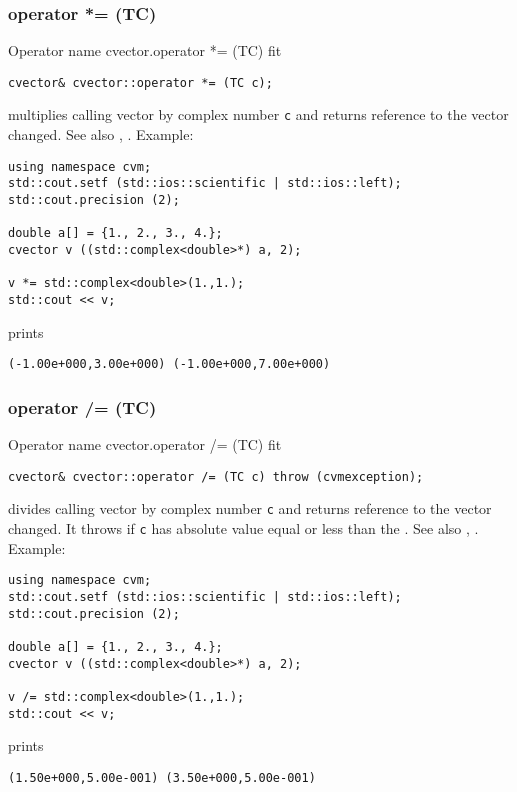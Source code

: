 \subsubsection{operator *= (TC)}
Operator%
\pdfdest name {cvector.operator *= (TC)} fit
\begin{verbatim}
cvector& cvector::operator *= (TC c);
\end{verbatim}
multiplies  calling vector by complex number \verb"c"
and returns  reference to
the vector changed.
See also ,
.
Example:
\begin{Verbatim}
using namespace cvm;
std::cout.setf (std::ios::scientific | std::ios::left);
std::cout.precision (2);

double a[] = {1., 2., 3., 4.};
cvector v ((std::complex<double>*) a, 2);

v *= std::complex<double>(1.,1.);
std::cout << v;
\end{Verbatim}
prints
\begin{Verbatim}
(-1.00e+000,3.00e+000) (-1.00e+000,7.00e+000)
\end{Verbatim}
\newpage



\subsubsection{operator /= (TC)}
Operator%
\pdfdest name {cvector.operator /= (TC)} fit
\begin{verbatim}
cvector& cvector::operator /= (TC c) throw (cvmexception);
\end{verbatim}
divides  calling vector by complex number \verb"c"
and returns  reference to
the vector changed.
It throws  
if \verb"c" has  absolute value equal or less
than the
.
See also ,
.
Example:
\begin{Verbatim}
using namespace cvm;
std::cout.setf (std::ios::scientific | std::ios::left);
std::cout.precision (2);

double a[] = {1., 2., 3., 4.};
cvector v ((std::complex<double>*) a, 2);

v /= std::complex<double>(1.,1.);
std::cout << v;
\end{Verbatim}
prints
\begin{Verbatim}
(1.50e+000,5.00e-001) (3.50e+000,5.00e-001)
\end{Verbatim}
\newpage



